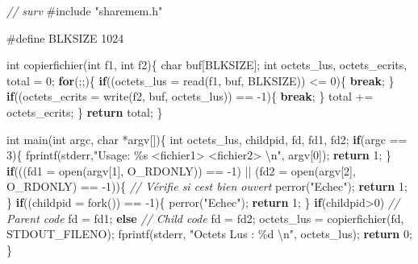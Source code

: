 \documentclass[
]{article}
\newenvironment{Shaded}{}{}
\newcommand{\CommentTok}[1]{\textcolor[rgb]{0.38,0.63,0.69}{\textit{#1}}}
\newcommand{\ControlFlowTok}[1]{\textcolor[rgb]{0.00,0.44,0.13}{\textbf{#1}}}
\newcommand{\DataTypeTok}[1]{\textcolor[rgb]{0.56,0.13,0.00}{#1}}
\newcommand{\DecValTok}[1]{\textcolor[rgb]{0.25,0.63,0.44}{#1}}
\newcommand{\ImportTok}[1]{#1}
\newcommand{\NormalTok}[1]{#1}
\newcommand{\PreprocessorTok}[1]{\textcolor[rgb]{0.74,0.48,0.00}{#1}}
\newcommand{\SpecialCharTok}[1]{\textcolor[rgb]{0.25,0.44,0.63}{#1}}
\newcommand{\StringTok}[1]{\textcolor[rgb]{0.25,0.44,0.63}{#1}}
\begin{document}
\begin{Shaded}
\begin{Highlighting}[]
\CommentTok{// surv}
\PreprocessorTok{\#include }\ImportTok{"sharemem.h"}

\PreprocessorTok{\#define BLKSIZE 1024}

\DataTypeTok{int}\NormalTok{ copierfichier(}\DataTypeTok{int}\NormalTok{ f1, }\DataTypeTok{int}\NormalTok{ f2)\{}
    \DataTypeTok{char}\NormalTok{ buf[BLKSIZE];}
    \DataTypeTok{int}\NormalTok{ octets\_lus, octets\_ecrits, total = }\DecValTok{0}\NormalTok{;}
    \ControlFlowTok{for}\NormalTok{(;;)\{}
        \ControlFlowTok{if}\NormalTok{((octets\_lus = read(f1, buf, BLKSIZE)) \textless{}= }\DecValTok{0}\NormalTok{)\{}
            \ControlFlowTok{break}\NormalTok{;}
\NormalTok{        \}}
        \ControlFlowTok{if}\NormalTok{((octets\_ecrits = write(f2, buf, octets\_lus)) == {-}}\DecValTok{1}\NormalTok{)\{}
            \ControlFlowTok{break}\NormalTok{;}
\NormalTok{        \}}
\NormalTok{        total += octets\_ecrits;}
\NormalTok{    \}}
    \ControlFlowTok{return}\NormalTok{ total;}
\NormalTok{\}}

\DataTypeTok{int}\NormalTok{ main(}\DataTypeTok{int}\NormalTok{ argc, }\DataTypeTok{char}\NormalTok{ *argv[])\{}
    \DataTypeTok{int}\NormalTok{ octets\_lus, childpid, fd, fd1, fd2;}
    \ControlFlowTok{if}\NormalTok{(argc == }\DecValTok{3}\NormalTok{)\{}
\NormalTok{        fprintf(stderr,}\StringTok{"Usage: \%s \textless{}fichier1\textgreater{} \textless{}fichier2\textgreater{} }\SpecialCharTok{\textbackslash{}n}\StringTok{"}\NormalTok{, argv[}\DecValTok{0}\NormalTok{]);}
        \ControlFlowTok{return} \DecValTok{1}\NormalTok{;}
\NormalTok{    \}}
    \ControlFlowTok{if}\NormalTok{(((fd1 = open(argv[}\DecValTok{1}\NormalTok{], O\_RDONLY)) == {-}}\DecValTok{1}\NormalTok{) || (fd2 = open(argv[}\DecValTok{2}\NormalTok{], O\_RDONLY) == {-}}\DecValTok{1}\NormalTok{))\{ }\CommentTok{// Vérifie si c\textquotesingle{}est bien ouvert}
\NormalTok{        perror(}\StringTok{"Echec"}\NormalTok{);}
        \ControlFlowTok{return} \DecValTok{1}\NormalTok{;}
\NormalTok{    \}}
    \ControlFlowTok{if}\NormalTok{((childpid = fork()) == {-}}\DecValTok{1}\NormalTok{)\{}
\NormalTok{        perror(}\StringTok{"Echec"}\NormalTok{);}
        \ControlFlowTok{return} \DecValTok{1}\NormalTok{;}
\NormalTok{    \}}
    \ControlFlowTok{if}\NormalTok{(childpid\textgreater{}}\DecValTok{0}\NormalTok{) }\CommentTok{// Parent code}
\NormalTok{        fd = fd1;}
    \ControlFlowTok{else}  \CommentTok{// Child code}
\NormalTok{        fd = fd2;}
\NormalTok{    octets\_lus = copierfichier(fd, STDOUT\_FILENO);}
\NormalTok{    fprintf(stderr, }\StringTok{"Octets Lus : \%d }\SpecialCharTok{\textbackslash{}n}\StringTok{"}\NormalTok{, octets\_lus);}
    \ControlFlowTok{return} \DecValTok{0}\NormalTok{;}
\NormalTok{\}}



\end{Highlighting}
\end{Shaded}
\end{document}
